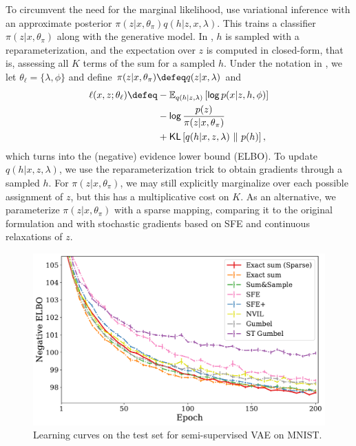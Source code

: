 To circumvent the need for the marginal likelihood,
\citet{KingmaEtAl2014SSVAE} use variational inference
\citep{Jordan+1999:VI} with an approximate posterior $\pi(z|x,
    \theta_\pi)q(h|z,x, \lambda)$. This trains a
classifier $\pi(z|x, \theta_\pi)$ along with the generative model. In
\citet{KingmaEtAl2014SSVAE}, $h$ is sampled with a
reparameterization, and the expectation over $z$ is computed in
closed-form, that is, assessing all $K$ terms of the sum for a
sampled $h$. Under the notation in ,
we let $\theta_\ell = \{\lambda, \phi\}$ and define
$\pi(z|x, \theta_\pi) \defeq q(z|x, \lambda)$ and
%
\begin{align}
    \begin{split}
        \ell(x, z; \theta_\ell) \defeq
        & - \mathbb E_{q(h|z,  \lambda)}\left[ \log p(x |z, h, \phi) \right] \\
        & - \log \frac{p(z)}{\pi(z |x, \theta_\pi)}                          \\
        & + \KL\left[q(h |x, z, \lambda) \,\,\|\,\, p(h)\right],
        \label{eq:elbonotation}
    \end{split}
\end{align}
%
which turns  into the (negative) evidence lower bound
(ELBO). To update $q(h | x, z, \lambda)$, we use the
reparameterization trick to obtain gradients through a sampled $h$.
For $\pi(z | x, \theta_\pi)$, we may still explicitly marginalize over
each possible assignment of $z$, but this has a multiplicative cost
on $K$. As an alternative, we parameterize $\pi(z|x,
    \theta_\pi)$ with a sparse mapping, comparing it to the original
formulation and with stochastic gradients based on SFE and continuous
relaxations of $z$.

\begin{figure}[htbp]
    \centering
    \includegraphics[width=.9\textwidth]{Figures/ss_mnist_elbo_path.pdf}
    \caption{\label{fig:ssvaeelbo}Learning curves on the test set for semi-supervised VAE on MNIST.}
\end{figure}

